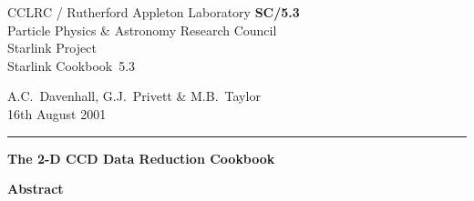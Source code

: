 \documentclass[twoside,11pt]{article}
\newcommand{\stardoccategory}  {Starlink Cookbook}
\newcommand{\stardocinitials}  {SC}
\newcommand{\stardocnumber}    {5.3}
\newcommand{\stardocauthors}   {A.C.~Davenhall, G.J.~Privett \& M.B.~Taylor}
\newcommand{\stardocdate}      {16th August 2001}
\newcommand{\stardoctitle}     {The 2-D CCD Data Reduction Cookbook}
\newcommand{\stardocname}{\stardocinitials /\stardocnumber}
\newenvironment{latexonly}{}{}
\begin{document}
\thispagestyle{empty}

\begin{latexonly}
   CCLRC / {\sc Rutherford Appleton Laboratory} \hfill {\bf \stardocname}\\
   {\large Particle Physics \& Astronomy Research Council}\\
   {\large Starlink Project\\}
   {\large \stardoccategory\ \stardocnumber}
   \begin{flushright}
   \stardocauthors\\
   \stardocdate
   \end{flushright}
   \vspace{-4mm}
   \rule{\textwidth}{0.5mm}
   \vspace{5mm}
   \begin{center}
   {\Huge\bf  \stardoctitle \\ [2.5ex]}
   \end{center}
   \vspace{5mm}


   \vspace{10mm}
   \begin{center}
      {\Large\bf Abstract}
   \end{center}
\end{latexonly}
\end{document}
